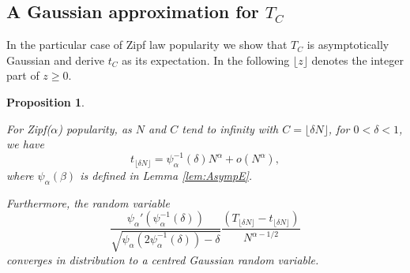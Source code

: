 \documentclass{amsart}
\newtheorem{proposition}{Proposition}
\begin{document}
\subsection{A Gaussian approximation for $T_C$}
In the particular case of Zipf law popularity we show that $T_C$ is asymptotically Gaussian and derive $t_C$ as its expectation. In the following $\lfloor z\rfloor$ denotes the integer part of $z\geq 0$.

\begin{proposition}
\label{tclim}

For Zipf($\alpha$) popularity, as $N$ and $C$ tend to infinity with $C=\lfloor \delta N\rfloor$, for $0<\delta<1$, we have
\begin{equation}
t_{\lfloor \delta N\rfloor}=\psi_\alpha^{-1}(\delta) N^{\alpha}+o(N^{\alpha}),
\label{eq:tC}
\end{equation}
where $\psi_\alpha(\beta)$ is defined in Lemma \ref{lem:AsympE}.

Furthermore, the random variable 
\[
\frac{\psi_\alpha'(\psi_\alpha^{-1}(\delta))}{\sqrt{\psi_\alpha(2\psi_\alpha^{-1}(\delta))-\delta}}\frac{(T_{\lfloor \delta N\rfloor}-t_{\lfloor \delta N\rfloor})}{N^{\alpha-1/2}}
\]
converges in distribution to a centred Gaussian random variable. 
\end{proposition}
\end{document}
